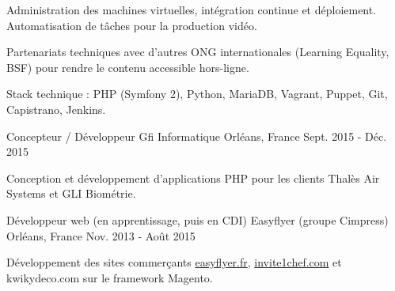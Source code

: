 \begin{cventries}
{\begin{cvitems}
        \item {Administration des machines virtuelles, intégration continue et déploiement. Automatisation de tâches pour la production vidéo.}
        \item {Partenariats techniques avec d'autres ONG internationales (Learning Equality, BSF) pour rendre le contenu accessible hors-ligne.}
        \item {Stack technique : PHP (Symfony 2), Python, MariaDB, Vagrant, Puppet, Git, Capistrano, Jenkins.}
      \end{cvitems}
    }
  \cventry
    {Concepteur / Développeur}
    {Gfi Informatique}
    {Orléans, France}
    {Sept. 2015 - Déc. 2015}
    {
      \begin{cvitems}
        \item {Conception et développement d'applications PHP pour les clients Thalès Air Systems et GLI Biométrie.}
      \end{cvitems}
    }
  \cventry
    {Développeur web (en apprentissage, puis en CDI)}
    {Easyflyer (groupe Cimpress)}
    {Orléans, France}
    {Nov. 2013 - Août 2015}
    {
      \begin{cvitems}
        \item {Développement des sites commerçants \href{https://www.easyflyer.fr}{easyflyer.fr}, \href{https://www.invite1chef.com}{invite1chef.com} et kwikydeco.com sur le framework Magento.}
      \end{cvitems}
    }
\end{cventries}
